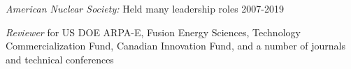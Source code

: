 \vspace*{-.5em}
\textit{American Nuclear Society:} Held many leadership roles 2007-2019
%
%
%
%
%
%
%
%


\vspace*{-.5em}
\textit{Reviewer} for US DOE ARPA-E, Fusion Energy Sciences, Technology Commercialization Fund, Canadian Innovation Fund, and a number of journals and technical conferences



